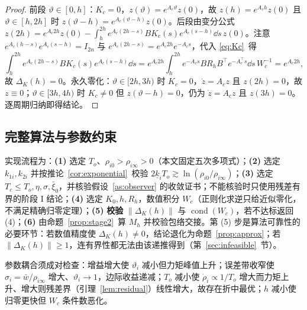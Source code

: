\begin{proof}
前段 \(\vartheta\in[0,h]\)：\(K_c=0\)，\(z(\vartheta)=e^{A_c\vartheta}z(0)\)，故 \(z(h)=e^{A_ch}z(0)\) 且 \(\vartheta\in[h,2h]\) 时 \(z(\vartheta-h)=e^{A_c(\vartheta-h)}z(0)\)。后段由变分公式
\(z(2h)=e^{A_c2h}z(0)-\int_h^{2h}e^{A_c(2h-s)}BK_c(s)e^{A_c(s-h)}\dd s\,z(0)\)。注意 \(e^{A_c(h-s)}e^{A_c(s-h)}=I_{2n}\) 与 \(e^{A_c(2h-s)}=e^{A_c2h}e^{-A_cs}\)，代入 \eqref{eq:Kc}~得
\[
\int_h^{2h}e^{A_c(2h-s)}BK_c(s)e^{A_c(s-h)}\dd s
=e^{A_c2h}\int_h^{2h}e^{-A_cs}BR_hB^{\top}e^{-A_c^{\top}s}\dd s\,W_c^{-1}=e^{A_c2h},
\]
故 \(\Delta_K(h)=0\)。永久零化：\(\vartheta\in[2h,3h)\) 时 \(K_c=0\)，\(\dot z=A_cz\) 且 \(z(2h)=0\)，故 \(z\equiv0\)；\(\vartheta\in[3h,4h)\) 时 \(K_c\neq0\) 但 \(z(\vartheta-h)=0\)，仍为 \(\dot z=A_cz\) 且 \(z(3h)=0\)。逐周期归纳即得结论。
\end{proof}

\subsection{完整算法与参数约束}
\label{sec:algorithm}

实现流程为：\textbf{(1)} 选定 \(T_o\)、\(\rho_{i0}>\rho_{i\infty}>0\)（本文固定五次多项式）；\textbf{(2)} 选定 \(k_{1i},k_{2i}\) 并按推论~\ref{cor:exponential}~校验 \(2\underline k_iT_o\gtrsim\ln(\rho_{i0}/\rho_{i\infty})\)；\textbf{(3)} 选定 \(T_c\le T_o,\eta,\sigma,\bar\xi_0\)，并核验假设~\ref{as:observer} 的收敛证书；不能核验时只使用残差有界的阶段 I 结论；\textbf{(4)} 选定 \(K_0,h,R_h\)，数值积分 \(W_c\)（正则化求逆只给近似零化，不满足精确归零定理）；\textbf{(5)} \textbf{校验} \(\lVert\Delta_K(h)\rVert\) 与 \(\operatorname{cond}(W_c)\)，若不达标返回 (4)；\textbf{(6)} 由命题~\ref{prop:stage2}~算 \(M_h\) 并校验包络交接。第 (5) 步是算法可靠性的必要环节：若数值精度使 \(\Delta_K(h)\neq0\)，结论退化为命题~\ref{prop:approx}；若 \(\lVert\Delta_K(h)\rVert\ge1\)，连有界性都无法由该递推得到（第~\ref{sec:infeasible}~节）。

参数耦合须成对检查：增益增大使 \(\vartheta_i\) 减小但力矩峰值上升；误差带收窄使 \(\sigma_i=\bar w/\rho_{i\infty}\) 增大、\(\vartheta_i\to1\)，边际收益递减；\(T_o\) 减小使 \(\dot\rho_i\propto1/T_o\) 增大而力矩上升、增大则残差界（引理~\ref{lem:residual}）线性增大，故存在折中最优；\(h\) 减小使归零更快但 \(W_c\) 条件数恶化。
